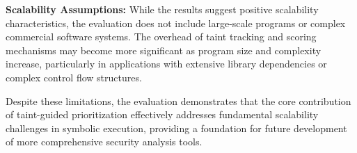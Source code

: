 \textbf{Scalability Assumptions:} While the results suggest positive scalability characteristics, the evaluation does not include large-scale programs or complex commercial software systems. The overhead of taint tracking and scoring mechanisms may become more significant as program size and complexity increase, particularly in applications with extensive library dependencies or complex control flow structures.

\vspace{1em}

Despite these limitations, the evaluation demonstrates that the core contribution of taint-guided prioritization effectively addresses fundamental scalability challenges in symbolic execution, providing a foundation for future development of more comprehensive security analysis tools.
